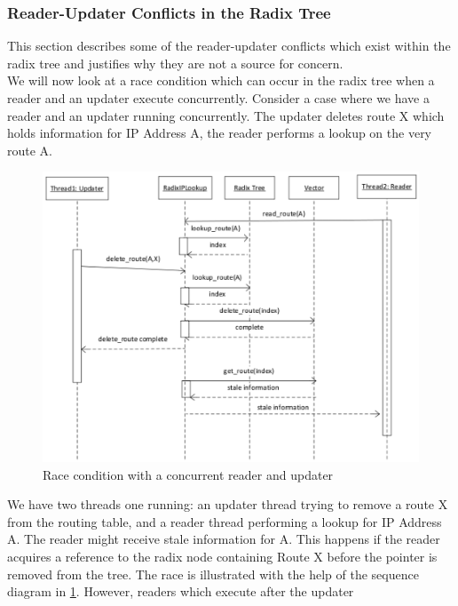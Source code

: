 \documentclass[a4paper]{article}
\begin{document}
\subsubsection{Reader-Updater Conflicts in the Radix Tree}
This section describes some of the reader-updater conflicts which
exist within the radix tree and justifies why they are not a source
for concern.\\

We will now look at a race condition which can occur in the radix tree
when a reader and an updater execute concurrently. Consider a case
where we have a reader and an updater running concurrently. The
updater deletes route X which holds information for IP Address A, the reader performs a lookup on the very
route A.\\
\begin{figure}[tph]
\begin{center}
\includegraphics[scale=0.6]{../images/diagrams/race1eps.eps}
\end{center}
\caption{Race condition with a concurrent reader and updater}
\label{race1figure}
\end{figure}
We have two threads one running: an updater thread trying to remove a
route X from the routing table, and a reader thread performing a
lookup for IP Address A. The reader might receive stale information
for A. This happens if the reader acquires a reference to the radix
node containing Route X before the pointer is removed from the
tree. The race is illustrated with the help of the sequence diagram in
\ref{race1figure}. However, readers which execute after the updater
\end{document}
